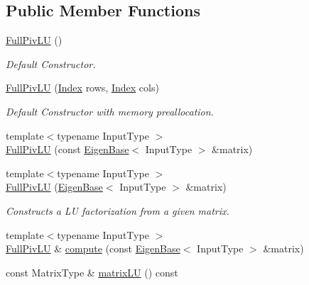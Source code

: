 \subsection*{Public Member Functions}
\begin{DoxyCompactItemize}
\item 
\mbox{\hyperlink{class_eigen_1_1_full_piv_l_u_af225528d1c6e623a2b1dce091907d13e}{Full\+Piv\+LU}} ()
\begin{DoxyCompactList}\small\item\em Default Constructor. \end{DoxyCompactList}\item 
\mbox{\hyperlink{class_eigen_1_1_full_piv_l_u_ae83ebd2a24088f04e3ac835b0dc001e1}{Full\+Piv\+LU}} (\mbox{\hyperlink{struct_eigen_1_1_eigen_base_a554f30542cc2316add4b1ea0a492ff02}{Index}} rows, \mbox{\hyperlink{struct_eigen_1_1_eigen_base_a554f30542cc2316add4b1ea0a492ff02}{Index}} cols)
\begin{DoxyCompactList}\small\item\em Default Constructor with memory preallocation. \end{DoxyCompactList}\item 
{\footnotesize template$<$typename Input\+Type $>$ }\\\mbox{\hyperlink{class_eigen_1_1_full_piv_l_u_a31a6a984478a9f721f367667fe4c5ab1}{Full\+Piv\+LU}} (const \mbox{\hyperlink{struct_eigen_1_1_eigen_base}{Eigen\+Base}}$<$ Input\+Type $>$ \&matrix)
\item 
{\footnotesize template$<$typename Input\+Type $>$ }\\\mbox{\hyperlink{class_eigen_1_1_full_piv_l_u_a3e903b9f401e3fc5d1ca7c6951c76185}{Full\+Piv\+LU}} (\mbox{\hyperlink{struct_eigen_1_1_eigen_base}{Eigen\+Base}}$<$ Input\+Type $>$ \&matrix)
\begin{DoxyCompactList}\small\item\em Constructs a LU factorization from a given matrix. \end{DoxyCompactList}\item 
{\footnotesize template$<$typename Input\+Type $>$ }\\\mbox{\hyperlink{class_eigen_1_1_full_piv_l_u}{Full\+Piv\+LU}} \& \mbox{\hyperlink{class_eigen_1_1_full_piv_l_u_a0a3c3b1bbafa31a03567a4573ebabc79}{compute}} (const \mbox{\hyperlink{struct_eigen_1_1_eigen_base}{Eigen\+Base}}$<$ Input\+Type $>$ \&matrix)
\item 
const Matrix\+Type \& \mbox{\hyperlink{class_eigen_1_1_full_piv_l_u_afea0b8fc707a9097d46fe358cb18bbff}{matrix\+LU}} () const

\end{DoxyCompactItemize}
